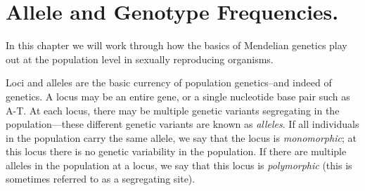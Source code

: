 


\chapter{Allele and Genotype Frequencies.}
 In this chapter we will
work through how the basics of Mendelian genetics play out at the population
level in sexually reproducing organisms.

	Loci and alleles are the basic currency of population genetics--and indeed of
genetics.  A locus
may be an entire gene, or a single nucleotide base pair such as A-T. At each
locus, there may be multiple genetic variants segregating in the
population---these different genetic variants are known as \emph{alleles}. If
all individuals in the population carry the same allele, we say that the locus
is \emph{monomorphic}; at this locus there is no genetic variability in the
population. If there are multiple alleles in the population at a locus, we say
that this locus is \emph{polymorphic} (this is sometimes referred to
as a segregating site).

